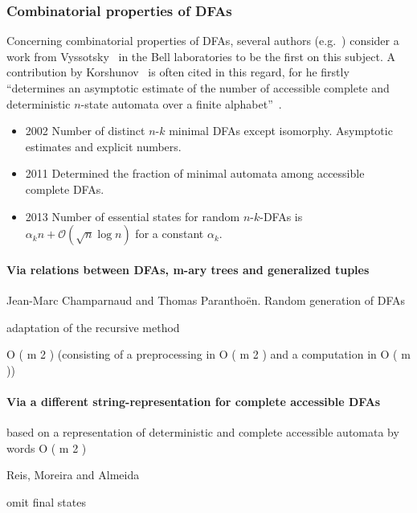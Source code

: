 \subsubsection{Combinatorial properties of DFAs}

Concerning combinatorial properties of DFAs, several authors (e.g.~\cite{BN07, DKS02, HJ14}) consider a work from Vyssotsky~\cite{Vys59} in the Bell laboratories to be the first on this subject. A contribution by Korshunov~\cite{Kor78} is often cited in this regard, for he firstly ``determines an asymptotic estimate of the number of accessible complete and deterministic $n$-state automata over a finite alphabet''~\cite{BDS11}.

\begin{itemize}
    \item 2002 \cite{DKS02} Number of distinct $n$-$k$ minimal DFAs except isomorphy. Asymptotic estimates and explicit numbers.
    
    \item 2011 \cite{BDS11} Determined the fraction of minimal automata among accessible complete DFAs.
    
    \item 2013 \cite{BK13} Number of essential states for random $n$-$k$-DFAs is $\alpha_k n + \mathcal{O}(\sqrt{n}\log n)$ for a constant $\alpha_k$.
\end{itemize}


\paragraph{Via relations between DFAs, m-ary trees and generalized tuples}

Jean-Marc Champarnaud and Thomas Paranthoën. Random generation of DFAs\cite{CP05}

adaptation of the
recursive method

 O ( m 2 ) (consisting of a preprocessing in O ( m 2 ) and
a computation in O ( m ))

\paragraph{Via a different string-representation for complete accessible DFAs}

 based on a representation of deterministic
and complete accessible automata by words O ( m 2 )

Reis, Moreira and Almeida~\cite{RMA05}\cite{AMR09}

omit final states

